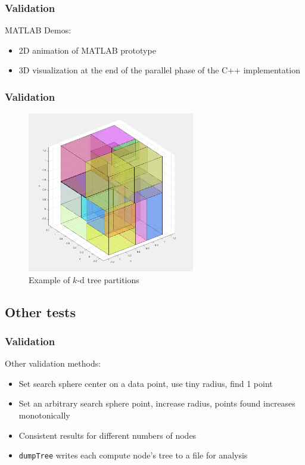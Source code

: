 \documentclass[usernames,dvipsnames]{beamer}
\begin{document}
\begin{frame}	
	\frametitle{Validation}
	
	\begin{block}{MATLAB Demos:}
		\begin{itemize}
			\item 2D animation of MATLAB prototype
			\item 3D visualization at the end of the parallel phase of the C++ implementation
		\end{itemize}
	\end{block}
	
\end{frame}

\begin{frame}	
	\frametitle{Validation}
	\vspace{-8pt}
	\begin{figure}
		\centering
		\includegraphics[width=0.65\textwidth]{images/squares.png}
		\vspace{-15pt}
		\caption{Example of $k$-d tree partitions}
	\end{figure}
	
\end{frame}


\subsection{Other tests}

\begin{frame}	
	\frametitle{Validation}
	
	\begin{block}{Other validation methods:}
		\begin{itemize}
			\item Set search sphere center on a data point, use tiny radius, find 1 point
			\item Set an arbitrary search sphere point, increase radius, points found increases monotonically
			\item Consistent results for different numbers of nodes
			\item \texttt{dumpTree} writes each compute node's tree to a file for analysis
		\end{itemize}
	\end{block}
	
\end{frame}
\end{document}
